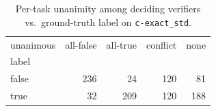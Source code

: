 \begin{table}[t]
  \centering
  \caption{Per-task unanimity among deciding verifiers vs.\ ground-truth label on \texttt{c-exact_std}.}
  \label{tab:unanimous-c-exact_std}
\begin{tabular}{lrrrr}
\toprule
unanimous & all-false & all-true & conflict & none \\
label &  &  &  &  \\
\midrule
false & 236 & 24 & 120 & 81 \\
true & 32 & 209 & 120 & 188 \\
\bottomrule
\end{tabular}
\end{table}
